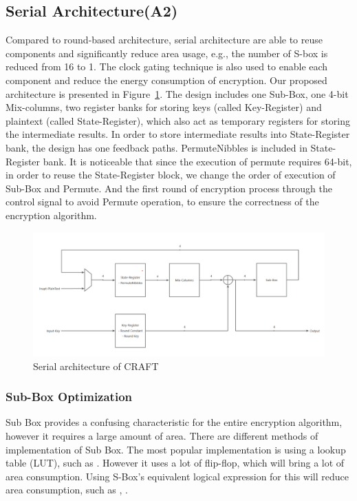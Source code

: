 \documentclass[sn-basic]{sn-jnl}%
\begin{document}
\subsection{Serial Architecture(A2)}\label{subsec2}
Compared to round-based architecture, serial architecture are able to reuse components and significantly reduce area usage, e.g., the number of S-box is reduced from 16 to 1.
The clock gating technique is also used to enable each component and reduce the energy consumption of encryption. Our proposed architecture is presented in Figure~\ref{fig3}.
The design includes one Sub-Box, one 4-bit Mix-columns, two register banks for storing keys (called Key-Register) and plaintext (called State-Register), which also act as temporary registers for storing the intermediate results.
In order to store intermediate results into State-Register bank, the design has one feedback paths.
PermuteNibbles is included in State-Register bank.
It is noticeable that since the execution of permute requires 64-bit, in order to reuse the State-Register block, we change the order of execution of Sub-Box and Permute.
And the first round of encryption process through the control signal to avoid Permute operation, to ensure the correctness of the encryption algorithm.

\begin{figure}[h]%
    \centering
    \includegraphics[width=\textwidth]{serial_design.png}
    \caption{Serial architecture of CRAFT}\label{fig3}
\end{figure}


\subsubsection{Sub-Box Optimization }\label{subsubsec1}
Sub Box provides a confusing characteristic for the entire encryption algorithm, however it requires a large amount of area.
There are different methods of implementation of Sub Box.
The most popular implementation is using a lookup table (LUT), such as \cite{lara2017lightweight}.
However it uses a lot of flip-flop, which will bring a lot of area consumption.
Using S-Box's equivalent logical expression for this will reduce area consumption, such as \cite{bao2019peigen}, \cite{bib16}.
\end{document}
